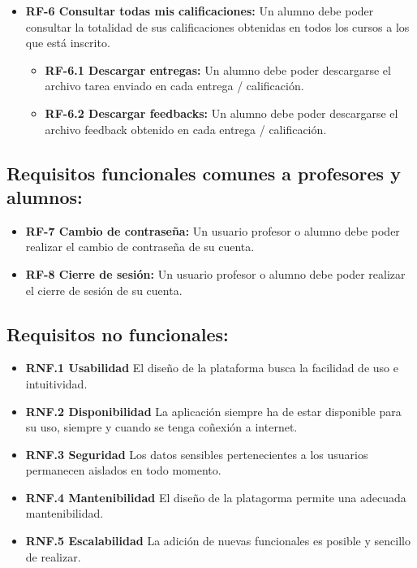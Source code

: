 \begin{itemize}
\begin{itemize}
  \end{itemize}
  
\item
    \textbf{RF-6 Consultar todas mis calificaciones:} Un alumno debe poder consultar la totalidad de sus calificaciones obtenidas en todos los cursos a los que está inscrito.
    
    \begin{itemize}
    \tightlist
    \item
      \textbf{RF-6.1 Descargar entregas:} Un alumno debe poder descargarse el archivo tarea enviado en cada entrega / calificación.

    \item
      \textbf{RF-6.2 Descargar feedbacks:} Un alumno debe poder descargarse el archivo feedback obtenido en cada entrega / calificación.
  
    \end{itemize}

\end{itemize}
 
\subsection{Requisitos funcionales comunes a profesores y alumnos:}
\begin{itemize}
\tightlist
\item
  \textbf{RF-7 Cambio de contraseña:} Un usuario profesor o alumno debe poder realizar el cambio de contraseña de su cuenta.
  
\item
  \textbf{RF-8 Cierre de sesión:} Un usuario profesor o alumno debe poder realizar el cierre de sesión de su cuenta.
  
\end{itemize}


\subsection{Requisitos no funcionales:}

\begin{itemize}
\tightlist
	\item \textbf{RNF.1 Usabilidad} El diseño de la plataforma busca la facilidad de uso e intuitividad.
	\item \textbf{RNF.2 Disponibilidad} La aplicación siempre ha de estar disponible para su uso, siempre y cuando se tenga coñexión a internet.
	\item \textbf{RNF.3 Seguridad} Los datos sensibles pertenecientes a los usuarios permanecen aislados en todo momento.
	\item \textbf{RNF.4 Mantenibilidad} El diseño de la platagorma permite una adecuada mantenibilidad.
	\item \textbf{RNF.5 Escalabilidad} La adición de nuevas funcionales es posible y sencillo de realizar.
	
\end{itemize}

